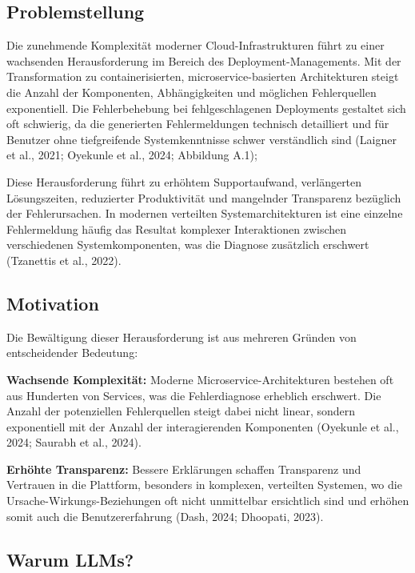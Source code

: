 \documentclass[
  a4paper,
  12pt,
  oneside,
  open=any,
  BCOR=12mm,
  DIV=14,
  parskip=half*,
  headsepline,
  footsepline,
  pointlessnumbers,
  liststotoc,
  numbers=noenddot,
  listof=totoc]{scrartcl}
\begin{document}
\setcounter{figure}{0}
\setcounter{table}{0}

\subsection{Problemstellung}\label{problemstellung}

Die zunehmende Komplexität moderner Cloud-Infrastrukturen führt zu einer
wachsenden Herausforderung im Bereich des Deployment-Managements. Mit
der Transformation zu containerisierten, microservice-basierten
Architekturen steigt die Anzahl der Komponenten, Abhängigkeiten und
möglichen Fehlerquellen exponentiell. Die Fehlerbehebung bei
fehlgeschlagenen Deployments gestaltet sich oft schwierig, da die
generierten Fehlermeldungen technisch detailliert und für Benutzer ohne
tiefgreifende Systemkenntnisse schwer verständlich sind (Laigner et al.,
2021; Oyekunle et al., 2024; Abbildung A.1);

Diese Herausforderung führt zu erhöhtem Supportaufwand, verlängerten
Lösungszeiten, reduzierter Produktivität und mangelnder Transparenz
bezüglich der Fehlerursachen. In modernen verteilten Systemarchitekturen
ist eine einzelne Fehlermeldung häufig das Resultat komplexer
Interaktionen zwischen verschiedenen Systemkomponenten, was die Diagnose
zusätzlich erschwert (Tzanettis et al., 2022).

\subsection{Motivation}\label{motivation}

Die Bewältigung dieser Herausforderung ist aus mehreren Gründen von
entscheidender Bedeutung:

\textbf{Wachsende Komplexität:} Moderne Microservice-Architekturen
bestehen oft aus Hunderten von Services, was die Fehlerdiagnose
erheblich erschwert. Die Anzahl der potenziellen Fehlerquellen steigt
dabei nicht linear, sondern exponentiell mit der Anzahl der
interagierenden Komponenten (Oyekunle et al., 2024; Saurabh et al.,
2024).

\textbf{Erhöhte Transparenz:} Bessere Erklärungen schaffen Transparenz
und Vertrauen in die Plattform, besonders in komplexen, verteilten
Systemen, wo die Ursache-Wirkungs-Beziehungen oft nicht unmittelbar
ersichtlich sind und erhöhen somit auch die Benutzererfahrung (Dash,
2024; Dhoopati, 2023).

\subsection{Warum LLMs?}\label{warum-llms}
\end{document}
